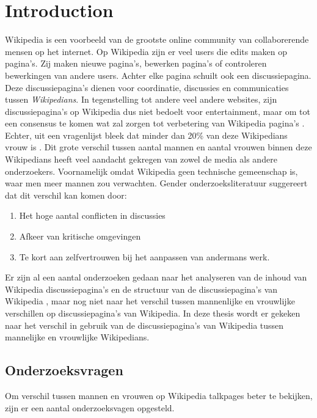 \section{Introduction}
\label{sec:intro}

Wikipedia is een voorbeeld van de grootste online community van collaborerende mensen op het internet. Op Wikipedia zijn er veel users die edits maken op pagina's. Zij maken nieuwe pagina's, bewerken pagina's of controleren bewerkingen van andere users. Achter elke pagina schuilt ook een discussiepagina. Deze discussiepagina's dienen voor coordinatie, discussies en communicaties tussen \textit{Wikipedians}. In tegenstelling tot andere veel andere websites, zijn discussiepagina's op Wikipedia dus niet bedoelt voor entertainment, maar om tot een consensus te komen wat zal zorgen tot verbetering van Wikipedia pagina's \citep{laniado2011wikipedians}.  Echter, uit een vragenlijst bleek dat minder dan 20\% van deze Wikipedians vrouw is \citep{glott2010analysis}. Dit grote verschil tussen aantal mannen en aantal vrouwen binnen deze Wikipedians heeft veel aandacht gekregen van zowel de media als andere onderzoekers. Voornamelijk omdat Wikipedia geen technische gemeenschap is, waar men meer mannen zou verwachten. Gender onderzoeksliteratuur \citep{collier2012conflict} suggereert dat dit verschil kan komen door:
\begin{enumerate}
    \item Het hoge aantal conflicten in discussies
    \item Afkeer van kritische omgevingen
    \item Te kort aan zelfvertrouwen bij het aanpassen van andermans werk.
\end{enumerate}  
Er zijn al een aantal onderzoeken gedaan naar het analyseren van de inhoud van Wikipedia discussiepagina's \citep{viegas2007talk} en de structuur van de discussiepagina's van Wikipedia \citep{laniado2011wikipedians}, maar nog niet naar het verschil tussen mannenlijke en vrouwlijke verschillen op discussiepagina's van Wikipedia. In deze thesis wordt er gekeken naar het verschil in gebruik van de discussiepagina's van Wikipedia tussen mannelijke en vrouwlijke Wikipedians.



\subsection{Onderzoeksvragen}
Om verschil tussen mannen en vrouwen op Wikipedia talkpages beter te bekijken, zijn er een aantal onderzoeksvagen opgesteld. 

